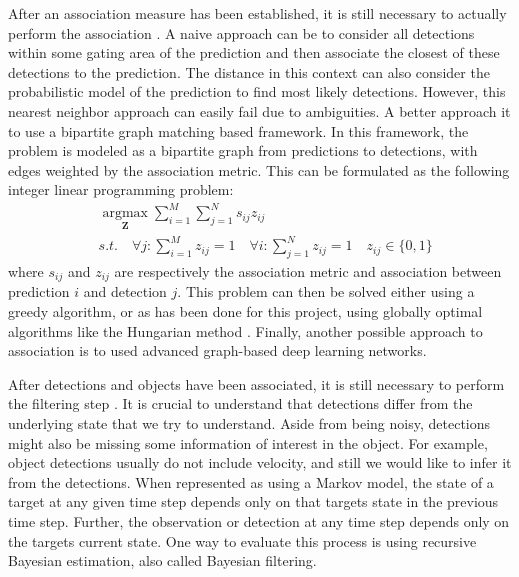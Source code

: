 After an association measure has been established, it is still necessary to actually perform the association \parencite[p. 136-140]{Lanz2026Notes}. A naive approach can be to consider all detections within some gating area of the prediction and then associate the closest of these detections to the prediction. The distance in this context can also consider the probabilistic model of the prediction to find most likely detections. However, this nearest neighbor approach can easily fail due to ambiguities. A better approach it to use a bipartite graph matching based framework. In this framework, the problem is modeled as a bipartite graph from predictions to detections, with edges weighted by the association metric. This can be formulated as the following integer linear programming problem:
\begin{align*}
  & \operatorname*{argmax}_{\mathbf{Z}} \sum_{i=1}^{M} \sum_{j=1}^{N} s_{ij} z_{ij} \\
  & s.t. \quad \forall j: \sum_{i=1}^{M} z_{ij} = 1 \quad \forall i: \sum_{j=1}^{N} z_{ij} = 1 \quad z_{ij} \in \{0, 1\}
\end{align*}
where $s_{ij}$ and $z_{ij}$ are respectively the association metric and association between prediction $i$ and detection $j$. This problem can then be solved either using a greedy algorithm, or as has been done for this project, using globally optimal algorithms like the Hungarian method \parencite{kuhn1955hungarian}. Finally, another possible approach to association is to used advanced graph-based deep learning networks.

After detections and objects have been associated, it is still necessary to perform the filtering step \parencite[p. 130-134]{Lanz2026Notes}. It is crucial to understand that detections differ from the underlying state that we try to understand. Aside from being noisy, detections might also be missing some information of interest in the object. For example, object detections usually do not include velocity, and still we would like to infer it from the detections. When represented as using a Markov model, the state of a target at any given time step depends only on that targets state in the previous time step. Further, the observation or detection at any time step depends only on the targets current state. One way to evaluate this process is using recursive Bayesian estimation, also called Bayesian filtering.

